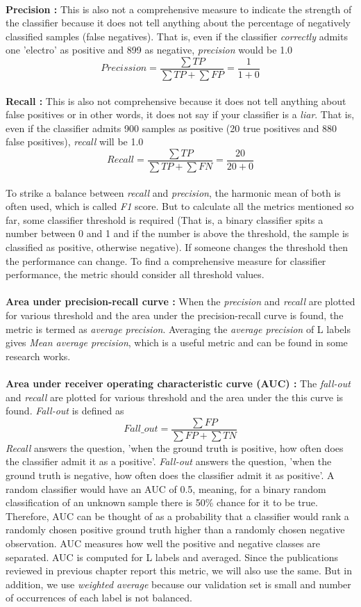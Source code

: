 \\
\textbf{Precision :} This is also not a comprehensive measure to indicate the strength of the classifier because it does not tell anything about the percentage of negatively classified samples (false negatives). That is, even if the classifier \textit{correctly} admits one 'electro' as positive and 899 as negative, \textit{precision} would be 1.0   
\[
  Precission = \frac{\sum TP}{\sum TP + \sum FP} = \frac{1}{1+0}
\]
\\
\textbf{Recall :} This is also not comprehensive because it does not tell anything about false positives or in other words, it does not say if your classifier is a \textit{liar}. That is, even if the classifier admits 900 samples as positive (20 true positives and 880 false positives), \textit{recall} will be 1.0
\[
  Recall = \frac{\sum TP}{\sum TP + \sum FN} = \frac{20}{20+0} 
\]
\\
To strike a balance between \textit{recall} and \textit{precision}, the harmonic mean of both is often used, which is called \textit{F1} score. But to calculate all the metrics mentioned so far, some classifier threshold is required (That is, a binary classifier spits a number between 0 and 1 and if the number is above the threshold, the sample is classified as positive, otherwise negative). If someone changes the threshold then the performance can change. To find a comprehensive measure for classifier performance, the metric should consider all threshold values.\\
\\ 
\textbf{Area under precision-recall curve :} When the\textit{ precision} and \textit{recall} are plotted for various threshold and the area under the precision-recall curve is found, the metric is termed as \textit{average precision}. Averaging the \textit{average precision} of L labels gives \textit{Mean average precision}, which is a useful metric and can be found in some research works.\\
\\
\textbf{Area under receiver operating characteristic curve (AUC) :} The \textit{fall-out} and \textit{recall} are plotted for various threshold and the area under the this curve is found. \textit{Fall-out} is defined as
\[
   Fall\_out = \frac{\sum FP}{\sum FP + \sum TN} 
\]
\textit{Recall} answers the question, 'when the ground truth is positive, how often does the classifier admit it as a positive'. \textit{Fall-out} answers the question, 'when the ground truth is negative, how often does the classifier admit it as positive'. A random classifier would have an AUC of 0.5, meaning, for a binary random classification of an unknown sample there is 50\% chance for it to be true. Therefore, AUC can be thought of as a probability that a classifier would rank a randomly chosen positive ground truth higher than a randomly chosen negative observation. AUC measures how well the positive and negative classes are separated. AUC is computed for L labels and averaged. Since the publications reviewed in previous chapter report this metric, we will also use the same. But in addition, we use \textit{weighted average} because our validation set is small and number of occurrences of each label is not balanced.\\
